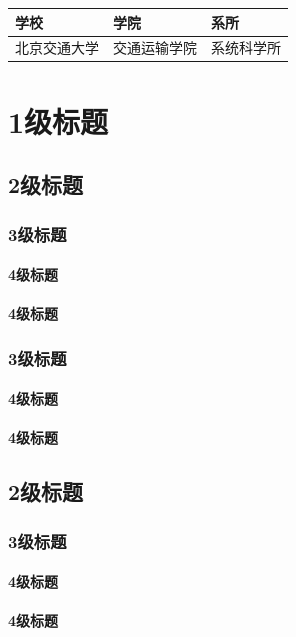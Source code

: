 \begin{bjtutable}
	\begin{tabularx}{\textwidth}{X<{\centering}X<{\centering}X<{\centering}}
		\toprule
		学校&学院&系所\\
		\midrule
		北京交通大学&交通运输学院&系统科学所\\
		\bottomrule
	\end{tabularx}
\end{bjtutable}



\chapter{1级标题}
\section{2级标题}
\subsection{3级标题}
\subsubsection{4级标题}
\subsubsection{4级标题}
\subsection{3级标题}
\subsubsection{4级标题}
\subsubsection{4级标题}
\section{2级标题}
\subsection{3级标题}
\subsubsection{4级标题}
\subsubsection{4级标题}

